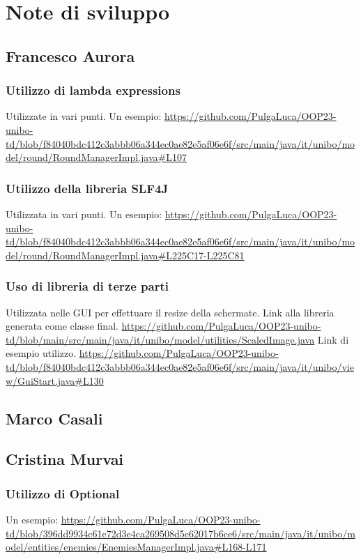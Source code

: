 \documentclass[a4paper,12pt]{report}
\begin{document}
\section{Note di sviluppo}

\subsection{Francesco Aurora}
\subsubsection{Utilizzo di lambda expressions}
Utilizzate in vari punti. Un esempio:
\url{https://github.com/PulgaLuca/OOP23-unibo-td/blob/f84040bdc412c3abbb06a344ec0ae82e5af06e6f/src/main/java/it/unibo/model/round/RoundManagerImpl.java#L107}

\subsubsection{Utilizzo della libreria SLF4J}
Utilizzata in vari punti. Un esempio:  
\url{https://github.com/PulgaLuca/OOP23-unibo-td/blob/f84040bdc412c3abbb06a344ec0ae82e5af06e6f/src/main/java/it/unibo/model/round/RoundManagerImpl.java#L225C17-L225C81}

\subsubsection{Uso di libreria di terze parti}
Utilizzata nelle GUI per effettuare il resize della schermate. Link alla libreria generata come classe final.
\url{https://github.com/PulgaLuca/OOP23-unibo-td/blob/main/src/main/java/it/unibo/model/utilities/ScaledImage.java}
Link di esempio utilizzo.
\url{https://github.com/PulgaLuca/OOP23-unibo-td/blob/f84040bdc412c3abbb06a344ec0ae82e5af06e6f/src/main/java/it/unibo/view/GuiStart.java#L130}
\subsection{Marco Casali}
\subsection{Cristina Murvai}
\subsubsection{Utilizzo di Optional}
Un esempio: \url{https://github.com/PulgaLuca/OOP23-unibo-td/blob/396dd9934c61e72d3e4ca269508d5e62017b6ce6/src/main/java/it/unibo/model/entities/enemies/EnemiesManagerImpl.java#L168-L171}
\end{document}

